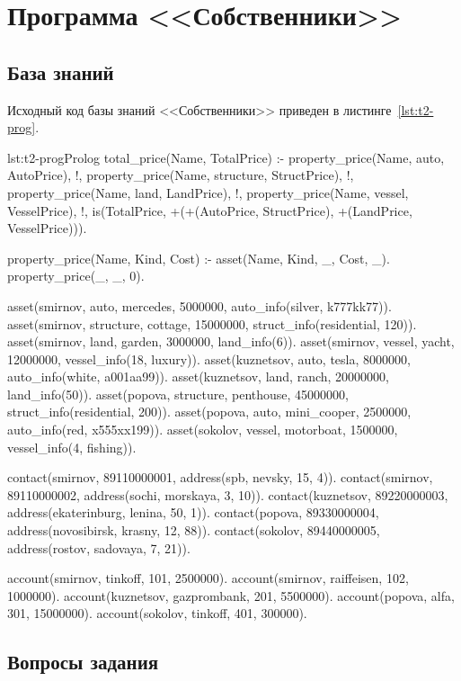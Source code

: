 \section{Программа <<Собственники>>}

\subsection{База знаний}
Исходный код базы знаний <<Собственники>> приведен в листинге~\ref{lst:t2-prog}.
\begin{listing}{lst:t2-prog}{Prolog}
total_price(Name, TotalPrice) :-  
    property_price(Name, auto, AutoPrice), !,
    property_price(Name, structure, StructPrice), !,
    property_price(Name, land, LandPrice), !,
    property_price(Name, vessel, VesselPrice), !,
    is(TotalPrice, +(+(AutoPrice, StructPrice), +(LandPrice, VesselPrice))).

property_price(Name, Kind, Cost) :- asset(Name, Kind, _, Cost, _).
property_price(_, _, 0). 

asset(smirnov, auto, mercedes, 5000000, auto_info(silver, k777kk77)).
asset(smirnov, structure, cottage, 15000000, struct_info(residential, 120)).
asset(smirnov, land, garden, 3000000, land_info(6)).
asset(smirnov, vessel, yacht, 12000000, vessel_info(18, luxury)).
asset(kuznetsov, auto, tesla, 8000000, auto_info(white, a001aa99)).
asset(kuznetsov, land, ranch, 20000000, land_info(50)).
asset(popova, structure, penthouse, 45000000, struct_info(residential, 200)).
asset(popova, auto, mini_cooper, 2500000, auto_info(red, x555xx199)).
asset(sokolov, vessel, motorboat, 1500000, vessel_info(4, fishing)).

contact(smirnov, 89110000001, address(spb, nevsky, 15, 4)).
contact(smirnov, 89110000002, address(sochi, morskaya, 3, 10)).
contact(kuznetsov, 89220000003, address(ekaterinburg, lenina, 50, 1)).
contact(popova, 89330000004, address(novosibirsk, krasny, 12, 88)).
contact(sokolov, 89440000005, address(rostov, sadovaya, 7, 21)).

account(smirnov, tinkoff, 101, 2500000).
account(smirnov, raiffeisen, 102, 1000000).
account(kuznetsov, gazprombank, 201, 5500000).
account(popova, alfa, 301, 15000000).
account(sokolov, tinkoff, 401, 300000).
\end{listing}

\subsection{Вопросы задания}

